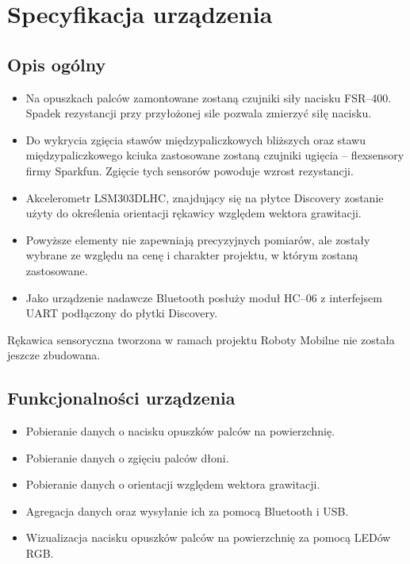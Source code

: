\documentclass[10pt,a4paper]{article}
\begin{document}
\newpage
\section{Specyfikacja urządzenia}

\subsection{Opis ogólny}
\begin{itemize}
\item Na opuszkach palców zamontowane zostaną czujniki siły nacisku FSR--400. Spadek rezystancji przy przyłożonej sile pozwala zmierzyć siłę nacisku.
\item Do wykrycia zgięcia stawów międzypaliczkowych bliższych oraz stawu międzypaliczkowego kciuka zastosowane zostaną czujniki ugięcia -- flexsensory firmy Sparkfun. Zgięcie tych sensorów powoduje wzrost rezystancji.
\item Akcelerometr LSM303DLHC, znajdujący się na płytce Discovery zostanie użyty do określenia orientacji rękawicy względem wektora grawitacji.
\item Powyższe elementy nie zapewniają precyzyjnych pomiarów, ale zostały wybrane ze względu na cenę i charakter projektu, w którym zostaną zastosowane.
\item Jako urządzenie nadawcze Bluetooth posłuży moduł HC--06 z interfejsem UART podłączony do płytki Discovery.
\end{itemize}
Rękawica sensoryczna tworzona w ramach projektu Roboty Mobilne nie została jeszcze zbudowana.

\subsection{Funkcjonalności urządzenia}
\begin{itemize}
\item Pobieranie danych o nacisku opuszków palców na powierzchnię.
\item Pobieranie danych o zgięciu palców dłoni.
\item Pobieranie danych o orientacji względem wektora grawitacji.
\item Agregacja danych oraz wysyłanie ich za pomocą Bluetooth i USB.
\item Wizualizacja nacisku opuszków palców na powierzchnię za pomocą LEDów RGB.
\end{itemize}

\newpage
\end{document}
